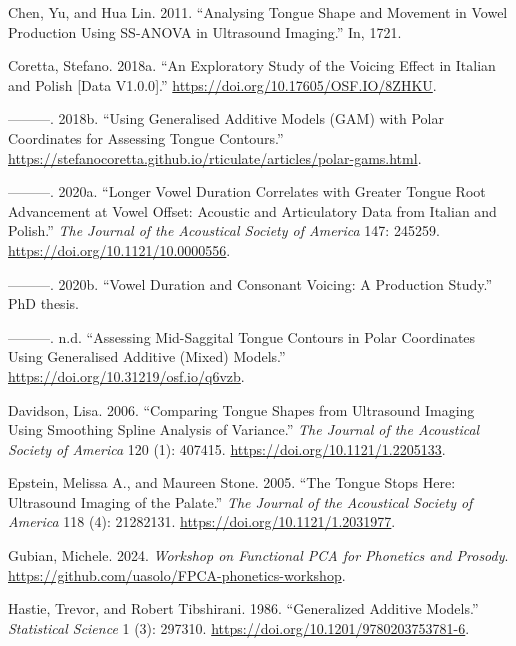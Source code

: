 \documentclass[
]{interact}
\newlength{\cslhangindent}
\newenvironment{CSLReferences}[2] %
 {\begin{list}{}{%
  \setlength{\itemindent}{0pt}
  \setlength{\leftmargin}{0pt}
  \setlength{\parsep}{0pt}
  \ifodd #1
   \setlength{\leftmargin}{\cslhangindent}
   \setlength{\itemindent}{-1\cslhangindent}
  \fi
  \setlength{\itemsep}{#2\baselineskip}}}
 {\end{list}}
\begin{document}
\label{refs}
\begin{CSLReferences}{1}{0}
Chen, Yu, and Hua Lin. 2011. {``Analysing Tongue Shape and Movement in
Vowel Production Using SS-ANOVA in Ultrasound Imaging.''} In, 1721.

Coretta, Stefano. 2018a. {``An Exploratory Study of the Voicing Effect
in Italian and Polish {[}Data V1.0.0{]}.''}
\url{https://doi.org/10.17605/OSF.IO/8ZHKU}.

---------. 2018b. {``Using Generalised Additive Models (GAM) with Polar
Coordinates for Assessing Tongue Contours.''}
\url{https://stefanocoretta.github.io/rticulate/articles/polar-gams.html}.

---------. 2020a. {``Longer Vowel Duration Correlates with Greater
Tongue Root Advancement at Vowel Offset: Acoustic and Articulatory Data
from Italian and Polish.''} \emph{The Journal of the Acoustical Society
of America} 147: 245259. \url{https://doi.org/10.1121/10.0000556}.

---------. 2020b. {``Vowel Duration and Consonant Voicing: A Production
Study.''} PhD thesis.

---------. n.d. {``Assessing Mid-Saggital Tongue Contours in Polar
Coordinates Using Generalised Additive (Mixed) Models.''}
\url{https://doi.org/10.31219/osf.io/q6vzb}.

Davidson, Lisa. 2006. {``Comparing Tongue Shapes from Ultrasound Imaging
Using Smoothing Spline Analysis of Variance.''} \emph{The Journal of the
Acoustical Society of America} 120 (1): 407415.
\url{https://doi.org/10.1121/1.2205133}.

Epstein, Melissa A., and Maureen Stone. 2005. {``The Tongue Stops Here:
Ultrasound Imaging of the Palate.''} \emph{The Journal of the Acoustical
Society of America} 118 (4): 21282131.
\url{https://doi.org/10.1121/1.2031977}.

Gubian, Michele. 2024. \emph{Workshop on Functional PCA for Phonetics
and Prosody}. \url{https://github.com/uasolo/FPCA-phonetics-workshop}.

Hastie, Trevor, and Robert Tibshirani. 1986. {``Generalized Additive
Models.''} \emph{Statistical Science} 1 (3): 297310.
\url{https://doi.org/10.1201/9780203753781-6}.


\end{CSLReferences}
\end{document}
